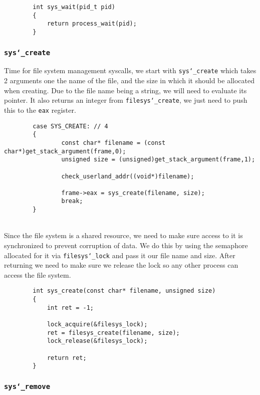 \documentclass[]{article}
\begin{document}
			\lstset{language=C, tabsize=2}  
		    \begin{lstlisting}   
		int sys_wait(pid_t pid)
		{
			return process_wait(pid);
		}
		   \end{lstlisting}	  
  \newpage
  \subsubsection{\texttt{sys\char`_create}}

	Time for file system management syscalls, we start with \texttt{sys\char`_create} which takes 2 arguments one the name of the file, and the size in which it should be allocated when creating. Due to the file name being a string, we will need to evaluate its pointer. It also returns an integer from \texttt{filesys\char`_create}, we just need to push this to the \texttt{eax} register.  
  
			\lstset{language=C, tabsize=2}  
		    \begin{lstlisting}   
		case SYS_CREATE: // 4
		{
				const char* filename = (const char*)get_stack_argument(frame,0);
				unsigned size = (unsigned)get_stack_argument(frame,1);
			
				check_userland_addr((void*)filename);
			
				frame->eax = sys_create(filename, size);
				break;
		}
		   \end{lstlisting}	
		   \texttt{}\\
		   Since the file system is a shared resource, we need to make sure access to it is synchronized to prevent corruption of data. We do this by using the semaphore allocated for it via \texttt{filesys\char`_lock} and pass it our file name and size. After returning we need to make sure we release the lock so any other process can access the file system.
  
			\lstset{language=C, tabsize=2}  
		    \begin{lstlisting}   
		int sys_create(const char* filename, unsigned size)
		{
			int ret = -1;
	
			lock_acquire(&filesys_lock);
			ret = filesys_create(filename, size);
			lock_release(&filesys_lock);
	
			return ret;
		}

		   \end{lstlisting}	    
		   
		   \newpage
  
  \subsubsection{\texttt{sys\char`_remove}}
  
\end{document}
